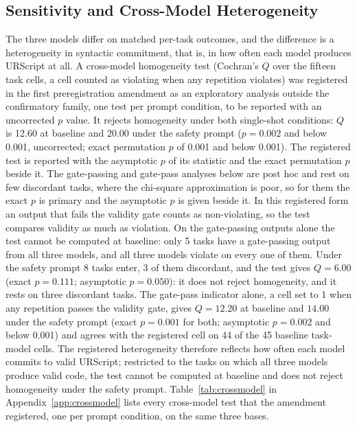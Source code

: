 \documentclass{ieeeaccess}
\begin{document}


\subsection{Sensitivity and Cross-Model Heterogeneity}\label{sec:res-sens}
The three models differ on matched per-task outcomes, and the difference is a
heterogeneity in syntactic commitment, that is, in how often each model produces URScript
at all. A cross-model homogeneity test (Cochran's $Q$ over the fifteen task cells, a cell
counted as violating when any repetition violates) was registered in the first
preregistration amendment as an exploratory analysis outside the confirmatory family, one
test per prompt condition, to be reported with an uncorrected $p$ value. It rejects
homogeneity under both single-shot conditions: $Q$ is 12.60 at baseline and 20.00 under
the safety prompt ($p = 0.002$ and below 0.001, uncorrected; exact permutation $p$ of 0.001
and below 0.001). The registered test is reported with the asymptotic $p$ of its statistic
and the exact permutation $p$ beside it. The gate-passing and gate-pass analyses below are
post hoc and rest on few discordant tasks, where the chi-square approximation is poor, so for
them the exact $p$ is primary and the asymptotic $p$ is given beside it. In this
registered form an output that fails the validity gate counts as non-violating, so the test
compares validity as much as violation. On the gate-passing outputs alone the test cannot
be computed at baseline: only 5 tasks have a gate-passing output from all three models,
and all three models violate on every one of them. Under the safety prompt 8 tasks enter,
3 of them discordant, and the test gives $Q = 6.00$ (exact $p = 0.111$; asymptotic
$p = 0.050$): it does not reject homogeneity, and it rests on three discordant tasks. The
gate-pass indicator alone, a cell set to 1 when any repetition passes the validity gate,
gives $Q = 12.20$ at baseline and $14.00$ under the safety prompt (exact $p = 0.001$ for
both; asymptotic $p = 0.002$ and below 0.001) and agrees with the registered cell on 44 of
the 45 baseline task-model cells. The registered heterogeneity therefore reflects how often
each model commits to valid URScript; restricted to the tasks on which all three models
produce valid code, the test cannot be computed at baseline and does not reject homogeneity
under the safety prompt.
Table~\ref{tab:crossmodel} in Appendix~\ref{app:crossmodel} lists every cross-model test
that the amendment registered, one per prompt condition, on the same three bases.
\end{document}

